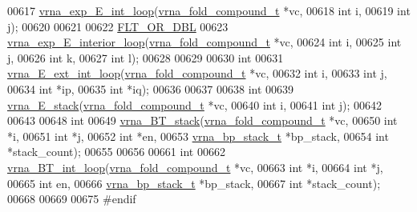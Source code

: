 \begin{DoxyCode}
00617 \mbox{\hyperlink{group__loops_ga516749f1374dccb079ea75c9711c31e6}{vrna\_exp\_E\_int\_loop}}(\mbox{\hyperlink{group__fold__compound_structvrna__fc__s}{vrna\_fold\_compound\_t}}  *vc,
00618                     \textcolor{keywordtype}{int}                   i,
00619                     \textcolor{keywordtype}{int}                   j);
00620 
00621 
00622 \mbox{\hyperlink{group__data__structures_ga31125aeace516926bf7f251f759b6126}{FLT\_OR\_DBL}}
00623 \mbox{\hyperlink{group__loops_gae27361b54e40da510011988326fcdfe1}{vrna\_exp\_E\_interior\_loop}}(\mbox{\hyperlink{group__fold__compound_structvrna__fc__s}{vrna\_fold\_compound\_t}} *vc,
00624                          \textcolor{keywordtype}{int}                  i,
00625                          \textcolor{keywordtype}{int}                  j,
00626                          \textcolor{keywordtype}{int}                  k,
00627                          \textcolor{keywordtype}{int}                  l);
00628 
00629 
00630 \textcolor{keywordtype}{int}
00631 \mbox{\hyperlink{group__loops_ga821f83d41e68dd5e8e3c182c989b1fbf}{vrna\_E\_ext\_int\_loop}}(\mbox{\hyperlink{group__fold__compound_structvrna__fc__s}{vrna\_fold\_compound\_t}}  *vc,
00632                     \textcolor{keywordtype}{int}                   i,
00633                     \textcolor{keywordtype}{int}                   j,
00634                     \textcolor{keywordtype}{int}                   *ip,
00635                     \textcolor{keywordtype}{int}                   *iq);
00636 
00637 
00638 \textcolor{keywordtype}{int}
00639 \mbox{\hyperlink{group__loops_gac1e873bc12317fa9318a8185018a6f60}{vrna\_E\_stack}}(\mbox{\hyperlink{group__fold__compound_structvrna__fc__s}{vrna\_fold\_compound\_t}} *vc,
00640              \textcolor{keywordtype}{int}                  i,
00641              \textcolor{keywordtype}{int}                  j);
00642 
00643 
00648 \textcolor{keywordtype}{int}
00649 \mbox{\hyperlink{group__loops_gad320d5d721e33bed120168213d8f45e5}{vrna\_BT\_stack}}(\mbox{\hyperlink{group__fold__compound_structvrna__fc__s}{vrna\_fold\_compound\_t}}  *vc,
00650               \textcolor{keywordtype}{int}                   *i,
00651               \textcolor{keywordtype}{int}                   *j,
00652               \textcolor{keywordtype}{int}                   *en,
00653               \mbox{\hyperlink{group__data__structures_structvrna__bp__stack__s}{vrna\_bp\_stack\_t}}       *bp\_stack,
00654               \textcolor{keywordtype}{int}                   *stack\_count);
00655 
00656 
00661 \textcolor{keywordtype}{int}
00662 \mbox{\hyperlink{group__loops_ga849b7dc373b6c0b029672e16a7e52053}{vrna\_BT\_int\_loop}}(\mbox{\hyperlink{group__fold__compound_structvrna__fc__s}{vrna\_fold\_compound\_t}} *vc,
00663                  \textcolor{keywordtype}{int}                  *i,
00664                  \textcolor{keywordtype}{int}                  *j,
00665                  \textcolor{keywordtype}{int}                  en,
00666                  \mbox{\hyperlink{group__data__structures_structvrna__bp__stack__s}{vrna\_bp\_stack\_t}}      *bp\_stack,
00667                  \textcolor{keywordtype}{int}                  *stack\_count);
00668 
00669 
00675 \textcolor{preprocessor}{#endif}
\end{DoxyCode}

